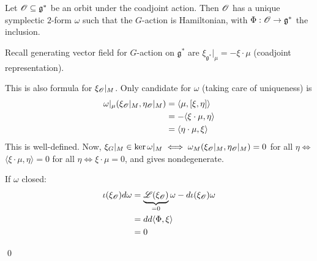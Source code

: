 \documentclass[x11names,reqno,14pt]{extarticle}
\newcommand{\mk}[1]{\mathfrak{#1}}
\newcommand{\g}{\mk{g}}
\begin{document}

Let $\ms{O}\subseteq\g^*$ be an orbit under the coadjoint action. Then $\mathscr{O}$ has a unique symplectic $2$-form $\omega$ such that the $G$-action is Hamiltonian, with $\Phi:\ms{O}\to\g^*$ the inclusion. 

\proof

Recall generating vector field for $G$-action on $\g^*$ are $\xi_{\g^*}|_{\mu} = -\xi\cdot\mu$ (coadjoint representation). 

This is also formula for $\xi_{\mathscr{O}}|_{M}$. Only candidate for $\omega$ (taking care of uniqueness) is
\begin{align*}
\omega|_{\mu}(\xi_{\mathscr{O}}|_{M}, \eta_{\mathscr{O}}|_{M}) & = \langle\mu,[\xi,\eta]\rangle\\
&=-\langle\xi\cdot\mu,\eta\rangle\\
&=\langle\eta\cdot\mu,\xi\rangle
\end{align*}
This is well-defined. Now, $\xi_G|_M\in\ker\omega|_M \iff \omega_M(\xi_{\mathscr{O}}|_M,\eta_{\mathscr{O}}|_M) = 0$ for all $\eta \iff$ $\langle\xi\cdot\mu,\eta\rangle=0$ for all $\eta \iff \xi\cdot\mu = 0$, and gives nondegenerate.

If $\omega$ closed:
\begin{align*}
\iota(\xi_{\mathscr{O}})d\omega & = \underbrace{\mathscr{L}(\xi_{\mathscr{O}})}_{=0}\omega-d\iota(\xi_{\mathscr{O}})\omega \\
& = dd\langle\Phi,\xi\rangle \\
& = 0
\end{align*}

\qed
\end{document}
